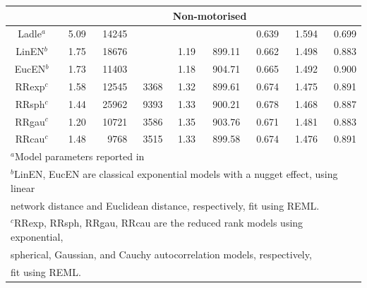 \documentclass[11pt, titlepage]{article}\usepackage[]{graphicx}\usepackage[]{color}
\begin{document}
\begin{spacing}{1.9}
\begin{flushleft}
\begin{table}[ht]
\begin{center}
\begin{tabular}{c|rrrr|rrrr}
	& \multicolumn{8}{c}{Non-motorised} \\
  \hline
Ladle$^a$ & 5.09 & 14245 &  &  &  & 0.639 & 1.594 & 0.699 \\ 
  LinEN$^b$ & 1.75 & 18676 &  & 1.19 & 899.11 & 0.662 & 1.498 & 0.883 \\ 
  EucEN$^b$ & 1.73 & 11403 &  & 1.18 & 904.71 & 0.665 & 1.492 & 0.900 \\ 
  RRexp$^c$ & 1.58 & 12545 & 3368 & 1.32 & 899.61 & 0.674 & 1.475 & 0.891 \\ 
  RRsph$^c$ & 1.44 & 25962 & 9393 & 1.33 & 900.21 & 0.678 & 1.468 & 0.887 \\ 
  RRgau$^c$ & 1.20 & 10721 & 3586 & 1.35 & 903.76 & 0.671 & 1.481 & 0.883 \\ 
  RRcau$^c$ & 1.48 & 9768 & 3515 & 1.33 & 899.58 & 0.674 & 1.476 & 0.891 \\ 
   \hline


\multicolumn{9}{l}{\footnotesize$^a$Model parameters reported in \citet{Ladl:Avga:Whea:Boyc:pred:2016}} \\
\multicolumn{9}{l}{\footnotesize$^b$LinEN, EucEN are classical exponential models with a nugget effect, using linear} \\
\multicolumn{9}{l}{\footnotesize \hspace{.5cm}  network distance and Euclidean distance, respectively, fit using REML.} \\
\multicolumn{9}{l}{\footnotesize$^c$RRexp, RRsph, RRgau, RRcau are the reduced rank models using exponential, } \\
\multicolumn{9}{l}{\footnotesize \hspace{.5cm} spherical, Gaussian, and Cauchy autocorrelation models, respectively,} \\
\multicolumn{9}{l}{\footnotesize \hspace{.5cm} fit using REML.}
\end{tabular}
\end{center}
\end{table}



\clearpage



\end{flushleft}
\end{spacing}
\end{document}
